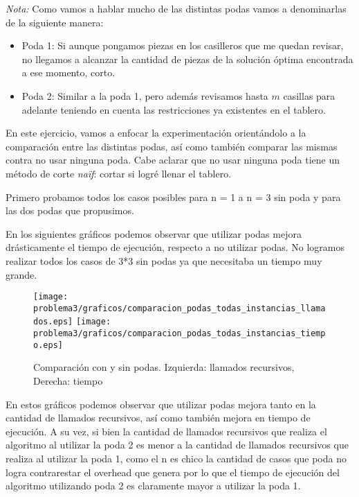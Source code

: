 \emph{Nota:} Como vamos a hablar mucho de las distintas podas vamos a denominarlas de la siguiente manera:
\begin{itemize}
\item Poda 1: Si aunque pongamos piezas en los casilleros que me quedan revisar, no llegamos a alcanzar la cantidad de piezas de la solución óptima encontrada a ese momento, corto.
\item Poda 2: Similar a la poda 1, pero además revisamos hasta $m$ casillas para adelante teniendo en cuenta las restricciones ya existentes en el tablero.
\end{itemize}

En este ejercicio, vamos a enfocar la experimentación orientándolo a la comparación entre las distintas podas, así como también comparar las mismas contra no usar ninguna poda. Cabe aclarar que no usar ninguna poda tiene un método de corte \emph{naïf}: cortar si logré llenar el tablero.

Primero probamos todos los casos posibles para n = 1 a n = 3 sin poda y para las dos podas que propusimos.

En los siguientes gráficos podemos observar que utilizar podas mejora drásticamente el tiempo de ejecución, respecto a no utilizar podas. No logramos realizar todos los casos de 3*3 sin podas ya que necesitaba un tiempo muy grande.

\begin{center}
  \begin{figure}[H]
    \texttt{[image: problema3/graficos/comparacion\_podas\_todas\_instancias\_llamados.eps]}
    \texttt{[image: problema3/graficos/comparacion\_podas\_todas\_instancias\_tiempo.eps]}
    \caption{Comparación con y sin podas. Izquierda: llamados recursivos, Derecha: tiempo}
    \label{fig:problema3-sin-y-con-podas}
  \end{figure}
\end{center}

En estos gráficos podemos observar que utilizar podas mejora tanto en la cantidad de llamados recursivos, así como también mejora en tiempo de ejecución. A su vez, si bien la cantidad de llamados recursivos que realiza el algoritmo al utilizar la poda 2 es menor a la cantidad de llamados recursivos que realiza al utilizar la poda 1, como el n es chico la cantidad de casos que poda no logra contrarestar el overhead que genera por lo que el tiempo de ejecución del algoritmo utilizando poda 2 es claramente mayor a utilizar la poda 1.


